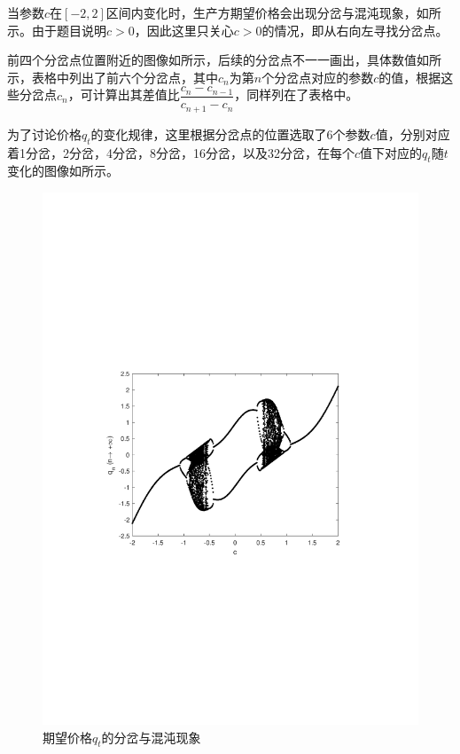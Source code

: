 \documentclass[12pt,a4paper]{article}
\begin{document}
当参数$c$在$[-2, 2]$区间内变化时，生产方期望价格会出现分岔与混沌现象，如所示。由于题目说明$c>0$，因此这里只关心$c>0$的情况，即从右向左寻找分岔点。

前四个分岔点位置附近的图像如所示，后续的分岔点不一一画出，具体数值如所示，表格中列出了前六个分岔点，其中$c_n$为第$n$个分岔点对应的参数$c$的值，根据这些分岔点$c_n$，可计算出其差值比$\dfrac{c_n-c_{n-1}}{c_{n+1}-c_n}$，同样列在了表格中。

为了讨论价格$q_t$的变化规律，这里根据分岔点的位置选取了6个参数$c$值，分别对应着1分岔，2分岔，4分岔，8分岔，16分岔，以及32分岔，在每个$c$值下对应的$q_t$随$t$变化的图像如所示。

\begin{figure}[t]
    \centering
    \includegraphics[width=\textwidth,trim={3.09cm 9.295cm 3.09cm 9.295cm},clip]{fig/ex8_chaos.pdf}
    \caption{期望价格$q_t$的分岔与混沌现象}
    \label{fig:ex8_chaos}
\end{figure}
\end{document}
